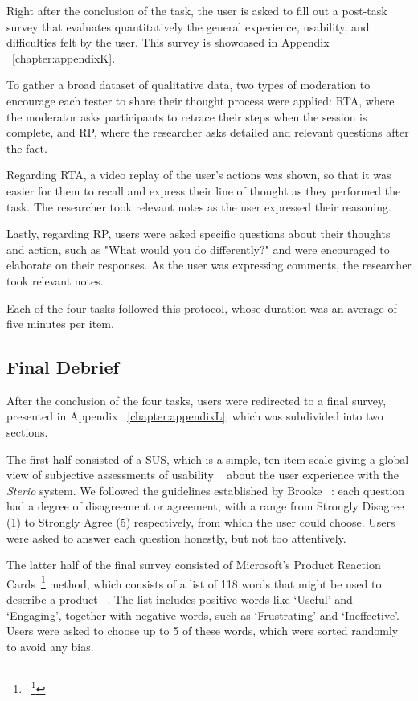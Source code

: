 Right after the conclusion of the task, the user is asked to fill out a post-task survey that evaluates quantitatively the general experience, usability, and difficulties felt by the user. This survey is showcased in Appendix ~\ref{chapter:appendixK}.

To gather a broad dataset of qualitative data, two types of moderation to encourage each tester to share their thought process were applied: \ac{RTA}, where the moderator asks participants to retrace their steps when the session is complete, and \ac{RP}, where the researcher asks detailed and relevant questions after the fact. ~\cite{Experience2011}

Regarding \ac{RTA}, a video replay of the user's actions was shown, so that it was easier for them to recall and express their line of thought as they performed the task. The researcher took relevant notes as the user expressed their reasoning.

Lastly, regarding \ac{RP}, users were asked specific questions about their thoughts and action, such as "What would you do differently?" and were encouraged to elaborate on their responses. As the user was expressing comments, the researcher took relevant notes.

Each of the four tasks followed this protocol, whose duration was an average of five minutes per item. 

\subsection{Final Debrief}
\label{sub:final}

After the conclusion of the four tasks, users were redirected to a final survey, presented in Appendix ~\ref{chapter:appendixL}, which was subdivided into two sections. 

The first half consisted of a \ac{SUS}, which is a simple, ten-item scale giving a global view of subjective assessments of usability ~\cite{Kusic2018} about the user experience with the \textit{Sterio} system. We followed the guidelines established by Brooke ~\cite{Kusic2018}: each question had a degree of disagreement or agreement, with a range from Strongly Disagree (1) to Strongly Agree (5) respectively, from which the user could choose. Users were asked to answer each question honestly, but not too attentively.

The latter half of the final survey consisted of Microsoft's Product Reaction Cards~\footnote{~\footnote{For more information on Microsoft's Product Reaction Cards, visit the \href{http://www.uxforthemasses.com/product-reaction-cards/}{UX for the Masses website.}}} method, which consists of a list of 118 words that might be used to describe a product ~\cite{Experience2011}. The list includes positive words like ‘Useful’ and ‘Engaging’, together with negative words, such as ‘Frustrating’ and ‘Ineffective’. Users were asked to choose up to 5 of these words, which were sorted randomly to avoid any bias.

